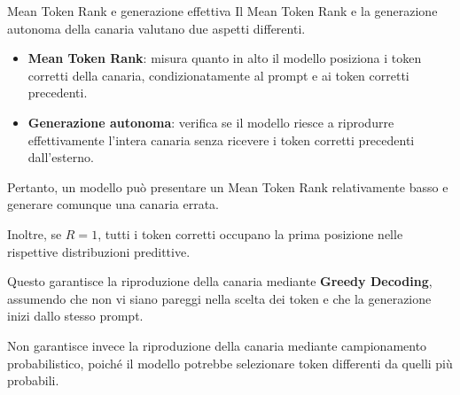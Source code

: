 \begin{observation}{Mean Token Rank e generazione effettiva}
Il Mean Token Rank e la generazione autonoma della canaria valutano due aspetti differenti.

\begin{itemize}
    \item \textbf{Mean Token Rank}: misura quanto in alto il modello posiziona i token corretti della canaria, condizionatamente al prompt e ai token corretti precedenti.
    
    \item \textbf{Generazione autonoma}: verifica se il modello riesce a riprodurre effettivamente l'intera canaria senza ricevere i token corretti precedenti dall'esterno.
\end{itemize}

Pertanto, un modello può presentare un Mean Token Rank relativamente basso e generare comunque una canaria errata.

Inoltre, se $R=1$, tutti i token corretti occupano la prima posizione nelle rispettive distribuzioni predittive.

Questo garantisce la riproduzione della canaria mediante \textbf{Greedy Decoding}, assumendo che non vi siano pareggi nella scelta dei token e che la generazione inizi dallo stesso prompt.

Non garantisce invece la riproduzione della canaria mediante campionamento probabilistico, poiché il modello potrebbe selezionare token differenti da quelli più probabili.
\end{observation}
